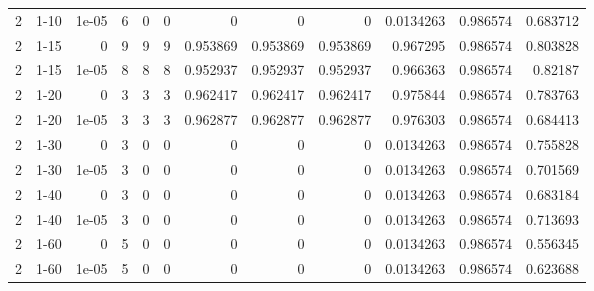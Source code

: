 \begin{tabular}{rlrrrrrrrrrr}
     2 & 1-10   &      1e-05 &           6 &                 0 &                 0 &     0           &     0           &      0           &        0.0134263 &               0.986574 &           0.683712 \\
     2 & 1-15   &      0     &           9 &                 9 &                 9 &     0.953869    &     0.953869    &      0.953869    &        0.967295  &               0.986574 &           0.803828 \\
     2 & 1-15   &      1e-05 &           8 &                 8 &                 8 &     0.952937    &     0.952937    &      0.952937    &        0.966363  &               0.986574 &           0.82187  \\
     2 & 1-20   &      0     &           3 &                 3 &                 3 &     0.962417    &     0.962417    &      0.962417    &        0.975844  &               0.986574 &           0.783763 \\
     2 & 1-20   &      1e-05 &           3 &                 3 &                 3 &     0.962877    &     0.962877    &      0.962877    &        0.976303  &               0.986574 &           0.684413 \\
     2 & 1-30   &      0     &           3 &                 0 &                 0 &     0           &     0           &      0           &        0.0134263 &               0.986574 &           0.755828 \\
     2 & 1-30   &      1e-05 &           3 &                 0 &                 0 &     0           &     0           &      0           &        0.0134263 &               0.986574 &           0.701569 \\
     2 & 1-40   &      0     &           3 &                 0 &                 0 &     0           &     0           &      0           &        0.0134263 &               0.986574 &           0.683184 \\
     2 & 1-40   &      1e-05 &           3 &                 0 &                 0 &     0           &     0           &      0           &        0.0134263 &               0.986574 &           0.713693 \\
     2 & 1-60   &      0     &           5 &                 0 &                 0 &     0           &     0           &      0           &        0.0134263 &               0.986574 &           0.556345 \\
     2 & 1-60   &      1e-05 &           5 &                 0 &                 0 &     0           &     0           &      0           &        0.0134263 &               0.986574 &           0.623688 \\

\end{tabular}
